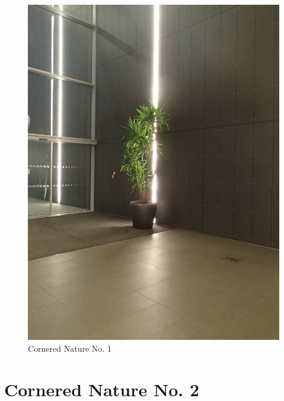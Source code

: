 \documentclass{article}
\begin{document}
\begin{figure}
\centering
\includegraphics[width=\textwidth,angle=-90]{figures/P1050156.JPG}
\caption{Cornered Nature No. 1}
\end{figure}

\chapter{Cornered Nature No. 2}
\end{document}

